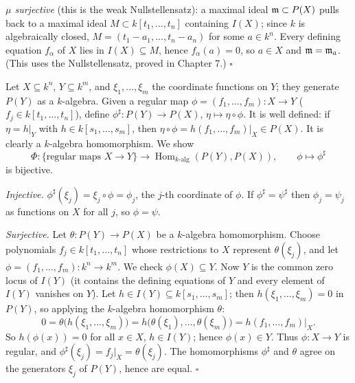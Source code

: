 \documentclass[11pt]{article}
\begin{document}
\emph{$\mu$ surjective} (this is the weak Nullstellensatz): a maximal ideal $\mathfrak m\subset P(X)$ pulls back to a maximal ideal $M\subset k[t_1,\dots,t_n]$ containing $I(X)$; since $k$ is algebraically closed, $M=(t_1-a_1,\dots,t_n-a_n)$ for some $a\in k^n$. Every defining equation $f_\alpha$ of $X$ lies in $I(X)\subseteq M$, hence $f_\alpha(a)=0$, so $a\in X$ and $\mathfrak m=\mathfrak m_a$. (This uses the Nullstellensatz, proved in Chapter 7.) \hfill$\square$

\pf
Let $X\subseteq k^n$, $Y\subseteq k^m$, and $\xi_1,\dots,\xi_m$ the coordinate functions on $Y$; they generate $P(Y)$ as a $k$-algebra. Given a regular map $\phi=(f_1,\dots,f_m):X\to Y$ ($f_j\in k[t_1,\dots,t_n]$), define $\phi^\sharp:P(Y)\to P(X)$, $\eta\mapsto\eta\circ\phi$. It is well defined: if $\eta=h|_Y$ with $h\in k[s_1,\dots,s_m]$, then $\eta\circ\phi=h(f_1,\dots,f_m)|_X\in P(X)$. It is clearly a $k$-algebra homomorphism. We show
\[
\Phi:\{\text{regular maps }X\to Y\}\longrightarrow\operatorname{Hom}_{k\text{-alg}}(P(Y),P(X)),\qquad\phi\mapsto\phi^\sharp
\]
is bijective.

\emph{Injective.} $\phi^\sharp(\xi_j)=\xi_j\circ\phi=\phi_j$, the $j$-th coordinate of $\phi$. If $\phi^\sharp=\psi^\sharp$ then $\phi_j=\psi_j$ as functions on $X$ for all $j$, so $\phi=\psi$.

\emph{Surjective.} Let $\theta:P(Y)\to P(X)$ be a $k$-algebra homomorphism. Choose polynomials $f_j\in k[t_1,\dots,t_n]$ whose restrictions to $X$ represent $\theta(\xi_j)$, and let $\phi=(f_1,\dots,f_m):k^n\to k^m$. We check $\phi(X)\subseteq Y$. Now $Y$ is the common zero locus of $I(Y)$ (it contains the defining equations of $Y$ and every element of $I(Y)$ vanishes on $Y$). Let $h\in I(Y)\subseteq k[s_1,\dots,s_m]$; then $h(\xi_1,\dots,\xi_m)=0$ in $P(Y)$, so applying the $k$-algebra homomorphism $\theta$:
\[
0=\theta\bigl(h(\xi_1,\dots,\xi_m)\bigr)=h\bigl(\theta(\xi_1),\dots,\theta(\xi_m)\bigr)=h(f_1,\dots,f_m)|_X .
\]
So $h(\phi(x))=0$ for all $x\in X$, $h\in I(Y)$; hence $\phi(x)\in Y$. Thus $\phi:X\to Y$ is regular, and $\phi^\sharp(\xi_j)=f_j|_X=\theta(\xi_j)$. The homomorphisms $\phi^\sharp$ and $\theta$ agree on the generators $\xi_j$ of $P(Y)$, hence are equal. \hfill$\square$
\end{document}
